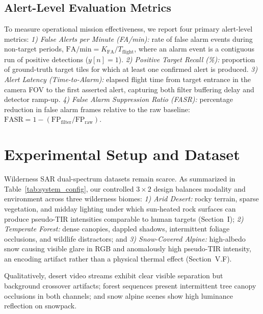 \documentclass[conference]{IEEEtran}
\begin{document}
\subsection{Alert-Level Evaluation Metrics}
To measure operational mission effectiveness, we report four primary alert-level metrics: \textit{1) False Alerts per Minute (FA/min):} rate of false alarm events during non-target periods, $\text{FA/min} = K_{\text{FA}} / T_{\text{flight}}$, where an alarm event is a contiguous run of positive detections ($y[n]=1$). \textit{2) Positive Target Recall (\%):} proportion of ground-truth target tiles for which at least one confirmed alert is produced. \textit{3) Alert Latency (Time-to-Alarm):} elapsed flight time from target entrance in the camera FOV to the first asserted alert, capturing both filter buffering delay and detector ramp-up. \textit{4) False Alarm Suppression Ratio (FASR):} percentage reduction in false alarm frames relative to the raw baseline: $\text{FASR} = 1 - (\text{FP}_{\text{filter}} / \text{FP}_{\text{raw}})$.

\section{Experimental Setup and Dataset}

Wilderness SAR dual-spectrum datasets remain scarce. As summarized in Table~\ref{tab:system_config}, our controlled $3\times 2$ design balances modality and environment across three wilderness biomes: \textit{1) Arid Desert:} rocky terrain, sparse vegetation, and midday lighting under which sun-heated rock surfaces can produce pseudo-TIR intensities comparable to human targets (Section~I); \textit{2) Temperate Forest:} dense canopies, dappled shadows, intermittent foliage occlusions, and wildlife distractors; and \textit{3) Snow-Covered Alpine:} high-albedo snow causing visible glare in RGB and anomalously high pseudo-TIR intensity, an encoding artifact rather than a physical thermal effect (Section~V.F).

Qualitatively, desert video streams exhibit clear visible separation but background crossover artifacts; forest sequences present intermittent tree canopy occlusions in both channels; and snow alpine scenes show high luminance reflection on snowpack.
\end{document}
